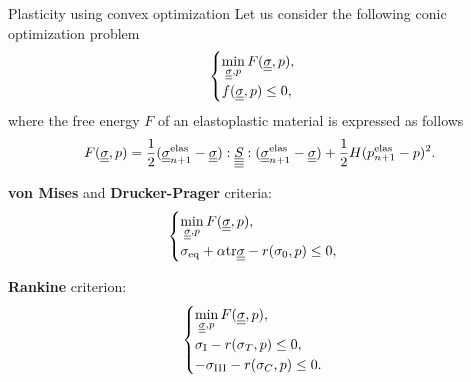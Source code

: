 \documentclass[9pt]{beamer}
\begin{document}
\begin{frame}{Plasticity using convex optimization}
  Let us consider the following conic optimization problem
  \begin{equation}
      \label{eqn:conic_problem}
      \begin{cases}
          \min\limits_{\underline{\underline{\sigma}}, p} F(\underline{\underline{\sigma}}, p), \\
          f(\underline{\underline{\sigma}}, p) \leq 0,
      \end{cases}
  \end{equation}
  where the free energy $F$ of an elastoplastic material is expressed as follows
  \begin{equation}
      F(\underline{\underline{\sigma}}, p) = \frac{1}{2}(\underline{\underline{\sigma}}_{n+1}^{\text{elas}} - \underline{\underline{\sigma}}) : \underline{\underline{\underline{\underline{S}}}} : (\underline{\underline{\sigma}}_{n+1}^{\text{elas}} - \underline{\underline{\sigma}}) + \frac{1}{2}H(p_{n+1}^\text{elas} - p)^2.
  \end{equation}

  \textbf{von Mises} and \textbf{Drucker-Prager} criteria:
  \begin{equation}
      \begin{cases}
          \min\limits_{\underline{\underline{\sigma}}, p} F(\underline{\underline{\sigma}}, p), \\
          \sigma_\text{eq} + \alpha\mathrm{tr}\underline{\underline{\sigma}} - r(\sigma_0, p) \leq 0,
      \end{cases}
  \end{equation}

  \textbf{Rankine} criterion:
  \begin{equation}
      \begin{cases}
          \min\limits_{\underline{\underline{\sigma}}, p} F(\underline{\underline{\sigma}}, p), \\
          \sigma_\text{I} - r(\sigma_T, p) \leq 0, \\
          -\sigma_\text{III} - r(\sigma_C, p) \leq 0.    
      \end{cases}
  \end{equation}
\end{frame}
\end{document}
